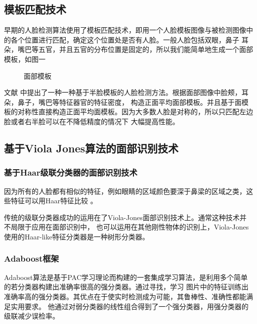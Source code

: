 \documentclass[UTF8]{ctexart}
\begin{document}
\subsection{模板匹配技术}
早期的人脸检测算法使用了模板匹配技术，即用一个人脸模板图像与被检测图像中的各个位置进行匹配，确定这个位置处是否有人脸。一般人脸包括双眼，鼻子
耳朵，嘴巴等五官，并且五官的分布位置是固定的，所以我们能简单地生成一个面部模板，如图一
\begin{figure}
    \centering
    \caption{面部模板}
    \label{fig.1}
\end{figure}
文献\cite{chen2009face}
中提出了一种一种基于半脸模板的人脸检测方法。根据面部图像中脸颊，耳朵，鼻子，嘴巴等特征器官的特征密度，
构造正面平均面部模板。并且基于面模板的对称性直接构造正面平均面模板。因为大多数人脸是对称的，所以只匹配左边脸或者右半脸可以在不降低精度的情况下
大幅提高性能。

\subsection{基于Viola Jones算法的面部识别技术}
\subsubsection{基于Haar级联分类器的面部识别技术}
因为所有的人脸都有相似的特征，例如眼睛的区域颜色要深于鼻梁的区域之类，这些特征可以用Haar特征比较
。\cite{dang2017review}

传统的级联分类器成功的运用在了Viola-Jones面部识别技术上。通常这种技术并不局限于应用在面部识别中，
也可以运用在其他刚性物体的识别上，Viola-Jones使用的Haar-like特征分类器是一种树形分类器。

\subsubsection{Adaboost框架}
Adaboost算法是基于PAC学习理论而构建的一套集成学习算法，是利用多个简单的若分类器构建出准确率很高的强分类器。通过寻找，学习
图片中的特征训练出准确率高的强分类器。其优点在于使实时检测成为可能，其鲁棒性、准确性都能满足实用要求。
他通过对弱分类器的线性组合得到了一个强分类器，用强分类器的级联减少误检率。\cite{zhao2011face}
\end{document}
